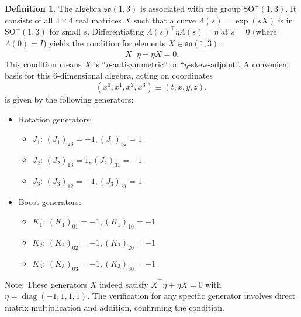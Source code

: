 \documentclass{amsart}
\theoremstyle{definition}
\newtheorem{definition}[theorem]{Definition}
\theoremstyle{remark}
\DeclareMathOperator{\diag}{diag}
\begin{document}
\begin{definition}
  The algebra $\mathfrak{so}(1,3)$ is associated with the group $\mathrm{SO}^+(1,3)$.
  It consists of all $4 \times 4$ real matrices $X$ such that a curve $\Lambda(s) = \exp(sX)$ is in $\mathrm{SO}^+(1,3)$ for small $s$.
  Differentiating $\Lambda(s)^\top \eta \Lambda(s) = \eta$ at $s=0$ (where $\Lambda(0)=I$) yields the condition for elements $X \in \mathfrak{so}(1,3)$:
  \begin{equation*}
    X^\top \eta + \eta X = 0.
  \end{equation*}
  This condition means $X$ is ``$\eta$-antisymmetric'' or ``$\eta$-skew-adjoint''.
  A convenient basis for this 6-dimensional algebra, acting on coordinates
  \begin{equation*}
    (x^0, x^1, x^2, x^3) \equiv (t,x,y,z),
  \end{equation*}
  is given by the following generators:
  \begin{itemize}
    \item Rotation generators:
      \begin{itemize}
        \item $J_1$: $(J_1)_{23} = -1, (J_1)_{32} = 1$
        \item $J_2$: $(J_2)_{13} = 1, (J_2)_{31} = -1$
        \item $J_3$: $(J_3)_{12} = -1, (J_3)_{21} = 1$
      \end{itemize}
    \item Boost generators:
      \begin{itemize}
        \item $K_1$: $(K_1)_{01} = -1, (K_1)_{10} = -1$
        \item $K_2$: $(K_2)_{02} = -1, (K_2)_{20} = -1$
        \item $K_3$: $(K_3)_{03} = -1, (K_3)_{30} = -1$
    \end{itemize}
  \end{itemize}
  Note: These generators $X$ indeed satisfy $X^\top \eta + \eta X = 0$ with $\eta=\diag(-1,1,1,1)$.
  The verification for any specific generator involves direct matrix multiplication and addition, confirming the condition.
\end{definition}
\end{document}
